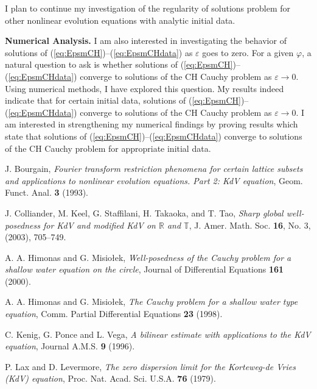 \documentclass[12pt]{article}
\begin{document}
\quad  I plan to continue my investigation of the regularity of solutions
problem for other nonlinear evolution
equations with analytic initial data.



\vskip 0.1in
\noindent
{\bf {Numerical Analysis.}}
I am also interested in investigating the
behavior of solutions of (\ref{eq:EpsmCH})--(\ref{eq:EpsmCHdata}) as
$\varepsilon$ goes to zero.
For a given $\varphi$, a natural question to ask is whether solutions
of (\ref{eq:EpsmCH})--(\ref{eq:EpsmCHdata}) converge to solutions of
the CH Cauchy problem as $\varepsilon \rightarrow 0$.  Using
numerical methods, I have explored this question.
My results indeed indicate that for certain
initial data, solutions of (\ref{eq:EpsmCH})--(\ref{eq:EpsmCHdata}) converge
to solutions of the CH Cauchy problem as $\varepsilon \rightarrow 0$.  I am
interested in strengthening my numerical findings by proving  results
which state that solutions of (\ref{eq:EpsmCH})--(\ref{eq:EpsmCHdata})
converge to solutions of the CH Cauchy problem for appropriate initial data.







\begin{thebibliography}{ABCDE}

 J. Bourgain, {\em Fourier transform restriction
phenomena  for certain lattice subsets  and applications to
nonlinear evolution equations.  Part 2: KdV equation}, Geom.
Funct. Anal. {\bf 3} (1993).

 J. Colliander, M. Keel, G. Staffilani,
H. Takaoka, and T. Tao,
{\em Sharp global well-posedness for KdV and modified KdV on $\mathbb R$ and
$\mathbb T$},
    J. Amer. Math. Soc. {\bf 16}, No. 3, (2003), 705--749.


 A. A. Himonas and G. Misio\l ek,  {\em Well-posedness of
the Cauchy problem for a shallow water equation on the circle},  Journal of
Differential Equations {\bf 161} (2000).


 A. A. Himonas and G. Misio\l ek,  {\em The
Cauchy problem for a shallow water type equation},  Comm.
Partial Differential Equations {\bf 23} (1998).

 C. Kenig, G. Ponce and L. Vega,  {\em A bilinear
estimate with applications to the KdV equation},
Journal A.M.S. {\bf 9} (1996).

 P. Lax and D. Levermore,  {\em The zero dispersion
limit for the Korteweg-de Vries (KdV) equation},  Proc. Nat. Acad.
Sci. U.S.A. {\bf 76} (1979).



\end{thebibliography}
\end{document}
